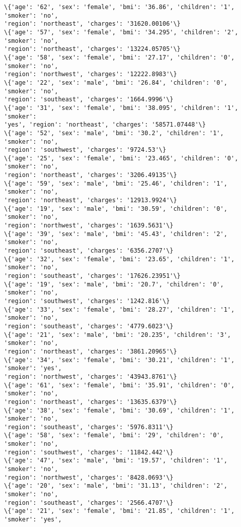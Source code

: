 \documentclass[11pt]{article}
\begin{document}
\begin{Verbatim}[commandchars=\\\{\}]
\{'age': '62', 'sex': 'female', 'bmi': '36.86', 'children': '1', 'smoker': 'no',
'region': 'northeast', 'charges': '31620.00106'\}
\{'age': '57', 'sex': 'female', 'bmi': '34.295', 'children': '2', 'smoker': 'no',
'region': 'northeast', 'charges': '13224.05705'\}
\{'age': '58', 'sex': 'female', 'bmi': '27.17', 'children': '0', 'smoker': 'no',
'region': 'northwest', 'charges': '12222.8983'\}
\{'age': '22', 'sex': 'male', 'bmi': '26.84', 'children': '0', 'smoker': 'no',
'region': 'southeast', 'charges': '1664.9996'\}
\{'age': '31', 'sex': 'female', 'bmi': '38.095', 'children': '1', 'smoker':
'yes', 'region': 'northeast', 'charges': '58571.07448'\}
\{'age': '52', 'sex': 'male', 'bmi': '30.2', 'children': '1', 'smoker': 'no',
'region': 'southwest', 'charges': '9724.53'\}
\{'age': '25', 'sex': 'female', 'bmi': '23.465', 'children': '0', 'smoker': 'no',
'region': 'northeast', 'charges': '3206.49135'\}
\{'age': '59', 'sex': 'male', 'bmi': '25.46', 'children': '1', 'smoker': 'no',
'region': 'northeast', 'charges': '12913.9924'\}
\{'age': '19', 'sex': 'male', 'bmi': '30.59', 'children': '0', 'smoker': 'no',
'region': 'northwest', 'charges': '1639.5631'\}
\{'age': '39', 'sex': 'male', 'bmi': '45.43', 'children': '2', 'smoker': 'no',
'region': 'southeast', 'charges': '6356.2707'\}
\{'age': '32', 'sex': 'female', 'bmi': '23.65', 'children': '1', 'smoker': 'no',
'region': 'southeast', 'charges': '17626.23951'\}
\{'age': '19', 'sex': 'male', 'bmi': '20.7', 'children': '0', 'smoker': 'no',
'region': 'southwest', 'charges': '1242.816'\}
\{'age': '33', 'sex': 'female', 'bmi': '28.27', 'children': '1', 'smoker': 'no',
'region': 'southeast', 'charges': '4779.6023'\}
\{'age': '21', 'sex': 'male', 'bmi': '20.235', 'children': '3', 'smoker': 'no',
'region': 'northeast', 'charges': '3861.20965'\}
\{'age': '34', 'sex': 'female', 'bmi': '30.21', 'children': '1', 'smoker': 'yes',
'region': 'northwest', 'charges': '43943.8761'\}
\{'age': '61', 'sex': 'female', 'bmi': '35.91', 'children': '0', 'smoker': 'no',
'region': 'northeast', 'charges': '13635.6379'\}
\{'age': '38', 'sex': 'female', 'bmi': '30.69', 'children': '1', 'smoker': 'no',
'region': 'southeast', 'charges': '5976.8311'\}
\{'age': '58', 'sex': 'female', 'bmi': '29', 'children': '0', 'smoker': 'no',
'region': 'southwest', 'charges': '11842.442'\}
\{'age': '47', 'sex': 'male', 'bmi': '19.57', 'children': '1', 'smoker': 'no',
'region': 'northwest', 'charges': '8428.0693'\}
\{'age': '20', 'sex': 'male', 'bmi': '31.13', 'children': '2', 'smoker': 'no',
'region': 'southeast', 'charges': '2566.4707'\}
\{'age': '21', 'sex': 'female', 'bmi': '21.85', 'children': '1', 'smoker': 'yes',

\end{Verbatim}
\end{document}
